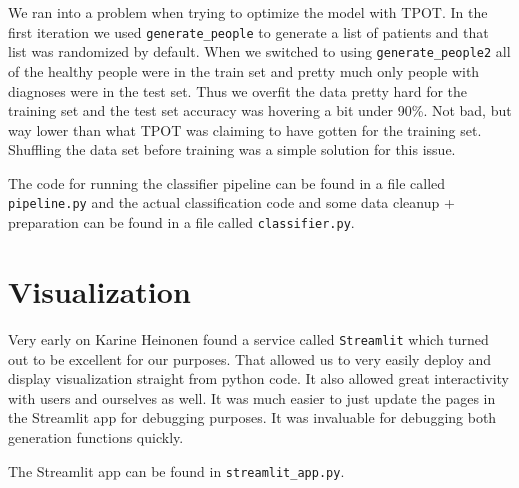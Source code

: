 \documentclass{article}
\begin{document}
We ran into a problem when trying to optimize the model with TPOT. In the first iteration we used \texttt{generate\_people} to generate a list of patients and that list was randomized by default. When we switched to using \texttt{generate\_people2} all of the healthy people were in the train set and pretty much only people with diagnoses were in the test set. Thus we overfit the data pretty hard for the training set and the test set accuracy was hovering a bit under 90\%. Not bad, but way lower than what TPOT was claiming to have gotten for the training set. Shuffling the data set before training was a simple solution for this issue.

The code for running the classifier pipeline can be found in a file called \texttt{pipeline.py} and the actual classification code and some data cleanup + preparation can be found in a file called \texttt{classifier.py}.

\section{Visualization}
Very early on Karine Heinonen found a service called \texttt{Streamlit} which turned out to be excellent for our purposes. That allowed us to very easily deploy and display visualization straight from python code. It also allowed great interactivity with users and ourselves as well. It was much easier to just update the pages in the Streamlit app for debugging purposes. It was invaluable for debugging both generation functions quickly. 

The Streamlit app can be found in \texttt{streamlit\_app.py}.
\end{document}

